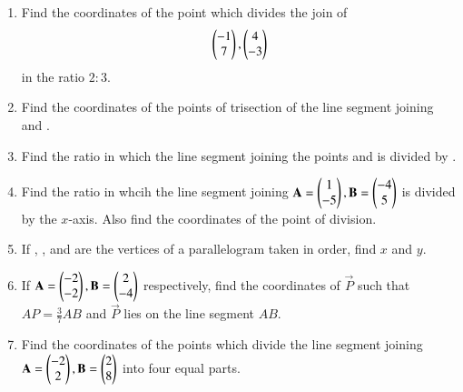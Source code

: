 \renewcommand{\theequation}{\theenumi}
\begin{enumerate}[label=\arabic*.,ref=\thesubsection.\theenumi]
\item Find the coordinates of the point which divides the join of 
\begin{align}
\begin{pmatrix}-1\\7\end{pmatrix},  \begin{pmatrix}4\\-3\end{pmatrix}
\end{align}
%
in the ratio $2:3$.
\\
\solution


\item Find the coordinates of the points of trisection of the line segment joining  and .
\item Find the ratio in which the line segment joining the points  and  is divided by .
\\
\solution

\item Find the ratio in whcih the line segment joining $\mathbf{A}=\begin{pmatrix}1\\-5\end{pmatrix}, \mathbf{B}=\begin{pmatrix}-4\\5\end{pmatrix}$ is divided by the $x$-axis.  Also find the coordinates of the point of division.
\\
\solution

\item If , ,  and  are the vertices of a parallelogram taken in order, find $x$ and $y$.
\item If $\mathbf{A}=\begin{pmatrix}-2\\-2\end{pmatrix}, \mathbf{B}=\begin{pmatrix}2\\-4\end{pmatrix}$ respectively, find the coordinates of $\vec{P}$ such that $AP = \frac{3}{7}AB$ and $\vec{P}$ lies on the line segment $AB$.
\item Find the coordinates of the points which divide the line segment joining $\mathbf{A}=\begin{pmatrix}-2\\2\end{pmatrix}, \mathbf{B}=\begin{pmatrix}2\\8\end{pmatrix}$ into four equal parts.

\end{enumerate}
